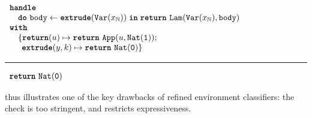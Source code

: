 \begin{code}
  \begin{efflst}
    $\begin{array}{l}
      \textbf{\texttt{handle}} \\
      \quad \texttt{\textbf{do}} \,\, {\texttt{body}} \leftarrow {\textbf{\texttt{extrude}}({\texttt{Var}(x_{\mathbb{N}})})} \; \textbf{\texttt{in}} \; {\texttt{\textbf{return}} \,\, {\texttt{Lam}(\texttt{Var}(x_{\mathbb{N}}), \texttt{body})}} \\
      \textbf{\texttt{with}} \\
      \quad \{ \textbf{\texttt{return}}(u) \mapsto \texttt{\textbf{return}} \,\, {\texttt{App}(u, \texttt{Nat}(\texttt{1}))}; \\
      \quad \; \, \textbf{\texttt{extrude}}(y, k) \mapsto { \texttt{\textbf{return}} \,\, {\texttt{Nat}(\texttt{0})}} \}\\
    \end{array}$

    \vspace{2mm} 
\textcolor{effComment}{\hrule height 0.2mm \relax}
\vspace{2mm} 

\textcolor{effComment}{$\begin{array}{l}\texttt{\textbf{return}} \,\, {\texttt{Nat}(\texttt{0})}\end{array}$}

\end{efflst}
%
\label{listing:efflang-no-scope-extrusion}
\end{code}

 thus illustrates one of the key drawbacks of refined environment classifiers: the check is too stringent, and restricts expressiveness. 